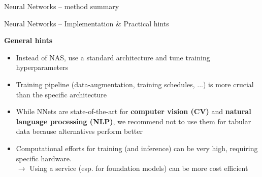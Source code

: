 \documentclass[11pt,compress,t,notes=noshow, xcolor=table]{beamer}
\newcommand{\highlight}[1]{\textcolor{hlcol}{\textbf{#1}}}
\begin{document}
\begin{vbframe}{Neural Networks -- method summary}
  
\end{vbframe}

\begin{vbframe}
  {Neural Networks -- Implementation \& Practical hints}

\highlight{General hints}
\begin{itemize}
    \item Instead of NAS, use a standard architecture and tune training hyperparameters
    \item Training pipeline (data-augmentation, training schedules, ...) is more crucial than the specific architecture
    \item While NNets are state-of-the-art for \textbf{computer vision (CV)} and \textbf{natural language processing (NLP)}, we recommend not to use them for tabular data because alternatives perform better
    \item Computational efforts for training (and inference) can be very high, requiring specific hardware.\\
    $\rightarrow$ Using a service (esp. for foundation models) can be more cost efficient
\end{itemize}




\end{vbframe}
\end{document}
